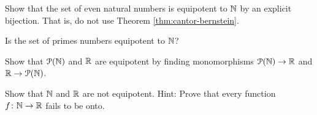 \begin{exercises}
	\begin{exerciselist}
		\item Show that the set of even natural numbers is equipotent to $\mathbb N$ by an explicit bijection. That is, do not use Theorem \ref{thm:cantor-bernstein}.
		\item Is the set of primes numbers equipotent to $\mathbb N$?
		\item Show that ${\mathcal{P}}(\mathbb N)$ and $\mathbb R$ are equipotent by finding monomorphisms ${\mathcal{P}}(\mathbb N)\to \mathbb R$ and $\mathbb R\to {\mathcal{P}}(\mathbb N)$.
		\item Show that $\mathbb N$ and $\mathbb R$ are not equipotent. Hint: Prove that every function ${f}\colon{\mathbb N}\to{\mathbb R}$ fails to be onto.
	\end{exerciselist}
\end{exercises} 